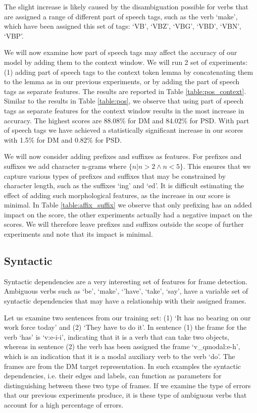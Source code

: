 The slight increase is likely caused by the disambiguation possible for verbs that are assigned a range of different part of speech tags, such as the verb `make', which have been assigned this set of tags: `VB', `VBZ', `VBG', `VBD', `VBN', `VBP'. 

We will now examine how part of speech tags may affect the accuracy of our model by adding them to the context window. We will run 2 set of experiments: (1) adding part of speech tags to the context token lemma by concatenating them to the lemma as in our previous experiments, or by adding the part of speech tags as separate features. The results are reported in Table \ref{table:pos_context}. Similar to the results in Table \ref{table:pos}, we observe that using part of speech tags as separate features for the context window results in the most increase in accuracy. The highest scores are 88.08\% for DM and 84.02\% for PSD. With part of speech tags we have achieved a statistically significant increase in our scores with 1.5\% for DM and 0.82\% for PSD.

We will now consider adding prefixes and suffixes as features. For prefixes and suffixes we add character n-grams where ${\{n|n>2 \wedge n<5\}}$. This ensures that we capture various types of prefixes and suffixes that may be constrained by character length, such as the suffixes `ing' and `ed'. It is difficult estimating the effect of adding such morphological features, as the increase in our score is minimal. In Table \ref{table:affix_suffix} we observe that only prefixing has an added impact on the score, the other experiments actually had a negative impact on the scores. We will therefore leave prefixes and suffixes outside the scope of further experiments and note that its impact is minimal.

\subsection{Syntactic}
\label{results_syn}


Syntactic dependencies are a very interesting set of features for frame detection. Ambiguous verbs such as `be', `make', `'have', `take', `say', have a variable set of syntactic dependencies that may have a relationship with their assigned frames. 

Let us examine two sentences from our training set: (1) `It has no bearing on our work force today' and (2) `They have to do it'. In sentence (1) the frame for the verb `has' is `v:e-i-i', indicating that it is a verb that can take two objects, whereas in sentence (2) the verb has been assigned the frame `v\_qmodal:e-h', which is an indication that it is a modal auxiliary verb to the verb `do'. The frames are from the DM target representation. In such examples the syntactic dependencies, i.e. their edges and labels, can function as parameters for distinguishing between these two type of frames. If we examine the type of errors that our previous experiments produce, it is these type of ambiguous verbs that account for a high percentage of errors.

